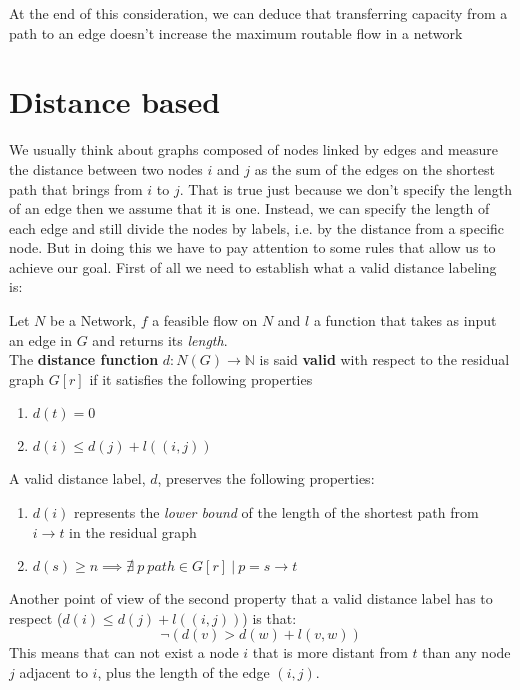 At the end of this consideration, we can deduce that transferring capacity from a path to an edge doesn't increase the maximum routable flow in a network
\newpage
\section{Distance based}
We usually think about graphs composed of nodes linked by edges and measure the distance between two nodes $i$ and $j$ as the sum of the edges on the shortest path that brings from $i$ to $j$. That is true just because we don't specify the length of an edge then we assume that it is one. Instead, we can specify the length of each edge and still divide the nodes by labels, i.e. by the distance from a specific node. But in doing this we have to pay attention to some rules that allow us to achieve our goal.
First of all we need to establish what a valid distance labeling is:
\begin{definition}
    \label{VDL}
    Let $N$ be a Network, $f$ a feasible flow on $N$ and $l$ a function that takes as input an edge in $G$ and returns its \textit{length}.\\
    The \textbf{distance function} $d: N(G) \rightarrow \mathbb{N}$ is said \textbf{valid} with respect to the residual graph $G[r]$ if it satisfies the following properties 
    \begin{enumerate}
        \item $d(t) = 0$
        \item $d(i) \le d(j) + l((i,j))$
    \end{enumerate}
\end{definition}

\begin{obs}
    A valid distance label, $d$, preserves the following properties:
    \begin{enumerate}
        \item $d(i)$ represents the \textit{lower bound} of the length of the shortest path from $i \rightarrow t$
        in the residual graph
        \item $d(s) \ge n \implies \nexists\ p\ path \in G[r]\ |\ p = s \rightarrow t $ 
    \end{enumerate}
    
\end{obs}
Another point of view of the second property that a valid distance label has to respect ($d(i) \le d(j) + l((i,j))$) is that:
\[\neg (d(v) > d(w) + l(v,w))\]
This means that can not exist a node $i$ that is more distant from $t$ than any node $j$ adjacent to $i$, plus the length of the edge $(i,j)$.

